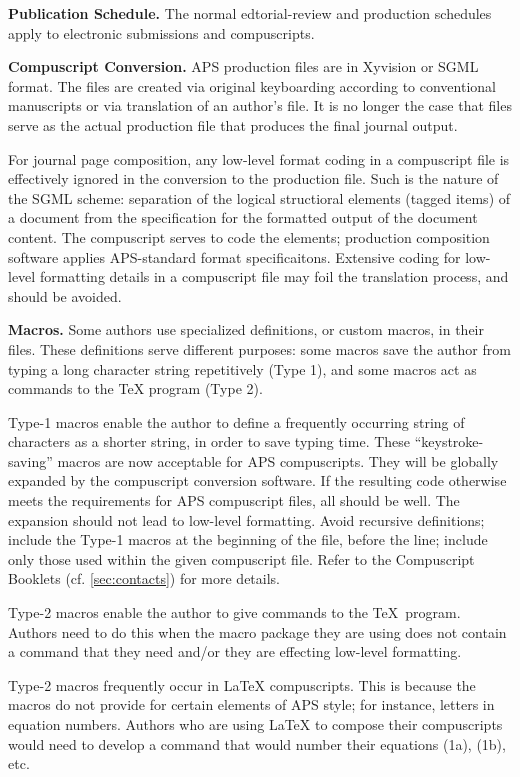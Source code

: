 {\bf Publication Schedule.} 
The normal edtorial-review and production schedules apply to
electronic submissions and compuscripts. 

{\bf Compuscript Conversion.} 
APS production files are in Xyvision or SGML format. The files are
created via original keyboarding according to conventional manuscripts
or via translation of an author's \REVTeX\/ file. It is no longer the
case that \REVTeX\/ files serve as the actual production file that
produces the final journal output. 

For journal page composition, any low-level format coding in a
compuscript file is effectively ignored in the conversion to the
production file. Such is the nature of the SGML scheme: separation of
the logical structioral elements (tagged items) of a document from
the specification for the formatted output of the document content.
The compuscript serves to code the elements; production composition
software applies APS-standard format specificaitons. Extensive coding
for low-level formatting details in a compuscript file may foil the
translation process, and should be avoided. 

\bigskip
{\bf Macros.}
Some authors use specialized definitions, or custom macros, in their files.  These
definitions serve different purposes:  some macros save the author from
typing a long character string repetitively (Type 1), and  some macros act
as commands to the \TeX{} program (Type 2).

Type-1 macros enable the author to
define a frequently occurring string of characters as a shorter string, in
order to save typing time. These ``keystroke-saving'' macros are now
acceptable for APS compuscripts. They will be globally expanded by the
compuscript conversion software. If the resulting code otherwise meets
the requirements for APS compuscript files, all should be well. The
expansion should not lead to low-level formatting. Avoid recursive
definitions; include the Type-1 macros at the beginning of the file,
before the \verb++ line; include only those used
within the given compuscript file. Refer to the Compuscript Booklets
(cf. \ref{sec:contacts}) for more details. 

Type-2 macros enable the author to give commands to the \TeX\ program.
Authors need to do this when the macro package they are using does not
contain a command that they need and/or they are effecting low-level
formatting. 

Type-2 macros frequently occur in \LaTeX{} compuscripts. This is because
the macros do not provide for certain elements of APS 
style; for instance, letters in equation numbers. Authors who are using
\LaTeX{} to compose their compuscripts would need to develop a command that
would number their equations (1a), (1b), etc.

